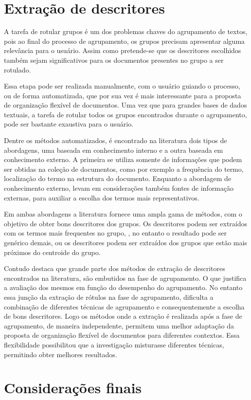 \section{Extração de descritores} 

A tarefa de rotular grupos é um dos problemas chaves do agrupamento de textos, pois ao final do
processo de agrupamento, os grupos precisam apresentar alguma relevância para o
usuário\cite{Zhang2008}. Assim como pretende-se que os descritores escolhidos também sejam
significativos para os documentos presentes no grupo a ser rotulado. 

Essa etapa pode ser realizada manualmente, com o usuário guiando o processo, ou de forma
automatizada, que por sua vez é mais interessante para a proposta de organização flexível de
documentos. Uma vez que para grandes bases de dados textuais, a tarefa de rotular todos os grupos
encontrados durante o agrupamento, pode ser bastante exaustiva para o usuário.

Dentre os métodos automatizados, é encontrado na literatura dois tipos de abordagens, uma baseada em
conhecimento interno e a outra baseada em conhecimento externo\cite{Nogueira2013}.  A primeira se
utiliza somente de informações que podem ser obtidas na coleção de documentos, como por exemplo a
frequência do termo, localização do termo na estrutura do documento.  Enquanto a abordagem de
conhecimento externo, levam em considerações também fontes de informação externas, para auxiliar a
escolha dos termos mais representativos. 

Em ambas abordagens a literatura fornece uma ampla gama de métodos, com o objetivo de obter bons
descritores dos grupos. Os descritores podem ser extraídos com os termos mais frequentes no grupo, ,
no entanto o resultado pode ser genérico demais\cite{Pucktada2006}, ou os descritores podem ser
extraídos dos grupos que estão mais próximos do centroide do grupo.

Contudo \cite{Nogueira2013} destaca que grande parte dos métodos de extração de descritores
encontrados na literatura, são embutidos na fase de agrupamento. O que justifica a avaliação dos
mesmos em função do desempenho do agrupamento. No entanto essa junção da extração de rótulos na fase
de agrupamento, dificulta a combinação de diferentes técnicas de agrupamento e consequentemente a
escolha de bons descritores. Logo os métodos onde a extração é realizada após a fase de agrupamento,
de maneira independente, permitem uma melhor adaptação da proposta de organização flexível de
documentos para diferentes contextos. Essa flexibilidade possibilitou que a investigação misturasse
diferentes técnicas, permitindo obter melhores resultados.

\section{Considerações finais}




